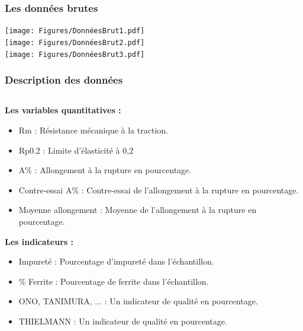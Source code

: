 \documentclass[aspectratio=169]{beamer}
\begin{document}
\begin{frame}
\frametitle{Les données brutes}
    \centering
    \texttt{[image: Figures/DonnéesBrut1.pdf]} \\
    \vspace{10pt}
    \texttt{[image: Figures/DonnéesBrut2.pdf]} \\
    \vspace{10pt}
    \texttt{[image: Figures/DonnéesBrut3.pdf]} 
\end{frame}

\begin{frame}
\frametitle{Description des données}
\begin{columns}[t] %
  \begin{column}{0.5\textwidth}
      \textbf{Les variables quantitatives :}
      \tiny
      \begin{itemize}
        \item Rm : Résistance mécanique à la traction.
        \item Rp0.2 : Limite d'élasticité à 0,2%
        \item A\% : Allongement à la rupture en pourcentage.
        \item Contre-essai A\% : Contre-essai de l'allongement à la rupture en pourcentage.
        \item Moyenne allongement : Moyenne de l'allongement à la rupture en pourcentage.
      \end{itemize}

     \vspace{10pt}
      \normalsize
      \textbf{Les indicateurs :}
      \tiny
      \begin{itemize}
        \item Impureté : Pourcentage d'impureté dans l'échantillon.
        \item \% Ferrite : Pourcentage de ferrite dans l'échantillon.
        \item ONO, TANIMURA, ... : Un indicateur de qualité en pourcentage.
        \item THIELMANN : Un indicateur de qualité en pourcentage.
      \end{itemize}
 \end{column}
    

\end{columns}
\end{frame}
\end{document}
